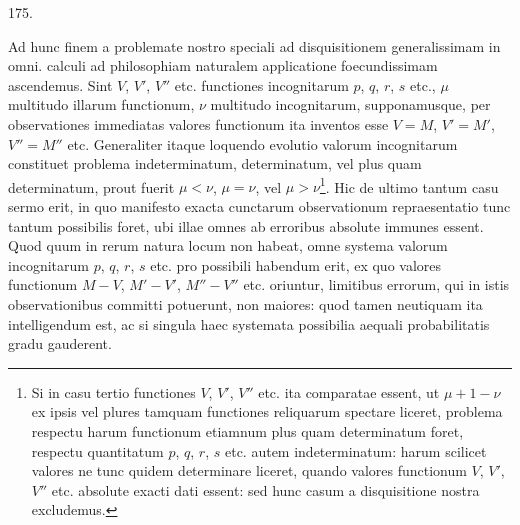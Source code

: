 \par{}\medskip
\begin{center}\hypertarget{native-246-article175}{}175.\end{center}
Ad hunc finem a problemate nostro speciali ad disquisitionem generalissimam
in omni. calculi ad philosophiam naturalem applicatione foecundissimam
ascendemus. Sint $V$, $V'$, $V''$ etc. functiones incognitarum $p$, $q$, $r$,
$s$ etc., $\mu$ multitudo illarum functionum, $\nu$ multitudo incognitarum,
supponamusque, per observationes immediatas valores functionum ita inventos
esse $V=M$, $V'=M'$, $V''=M''$ etc. Generaliter itaque loquendo evolutio
valorum incognitarum constituet problema indeterminatum, determinatum, vel
plus quam determinatum, prout fuerit $\mu<\nu$, $\mu=\nu$, vel
$\mu>\nu$\footnote{Si in casu tertio functiones $V$, $V'$, $V''$ etc. ita
comparatae essent, ut $\mu+1-\nu$ ex ipsis vel plures tamquam functiones
reliquarum spectare liceret, problema respectu harum functionum etiamnum
plus quam determinatum foret, respectu quantitatum $p$, $q$, $r$, $s$ etc.
autem indeterminatum: harum scilicet valores ne tunc quidem determinare
liceret, quando valores functionum $V$, $V'$, $V''$ etc. absolute exacti
dati essent: sed hunc casum a disquisitione nostra excludemus.}.
Hic de ultimo tantum casu sermo erit, in quo manifesto exacta cunctarum
observationum repraesentatio tunc tantum possibilis foret, ubi illae omnes
ab erroribus absolute immunes essent. Quod quum in rerum natura locum non
habeat, omne systema valorum incognitarum $p$, $q$, $r$, $s$ etc. pro possibili
habendum erit, ex quo valores functionum $M-V$, $M'-V'$,
$M''-V''$ etc. oriuntur, limitibus errorum, qui in istis observationibus
committi potuerunt, non maiores: quod tamen neutiquam ita intelligendum est,
ac si singula haec systemata possibilia aequali probabilitatis gradu gauderent.

